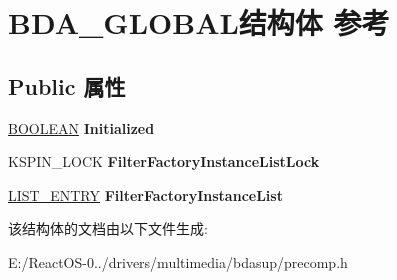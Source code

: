 \hypertarget{struct_b_d_a___g_l_o_b_a_l}{}\section{B\+D\+A\+\_\+\+G\+L\+O\+B\+A\+L结构体 参考}
\label{struct_b_d_a___g_l_o_b_a_l}
\subsection*{Public 属性}
\begin{DoxyCompactItemize}
\item 
\mbox{\label{struct_b_d_a___g_l_o_b_a_l_ae6aecc8a005234a26c3834a6ee815b93}} 
\hyperlink{_processor_bind_8h_a112e3146cb38b6ee95e64d85842e380a}{B\+O\+O\+L\+E\+AN} {\bfseries Initialized}
\item 
\mbox{\label{struct_b_d_a___g_l_o_b_a_l_afa5db95afe8f4517d7de275c45095a02}} 
K\+S\+P\+I\+N\+\_\+\+L\+O\+CK {\bfseries Filter\+Factory\+Instance\+List\+Lock}
\item 
\mbox{\label{struct_b_d_a___g_l_o_b_a_l_abe08222776a63fffb719d18fba101401}} 
\hyperlink{struct___l_i_s_t___e_n_t_r_y}{L\+I\+S\+T\+\_\+\+E\+N\+T\+RY} {\bfseries Filter\+Factory\+Instance\+List}
\end{DoxyCompactItemize}


该结构体的文档由以下文件生成\+:\begin{DoxyCompactItemize}
\item 
E\+:/\+React\+O\+S-\/0../drivers/multimedia/bdasup/precomp.\+h\end{DoxyCompactItemize}
